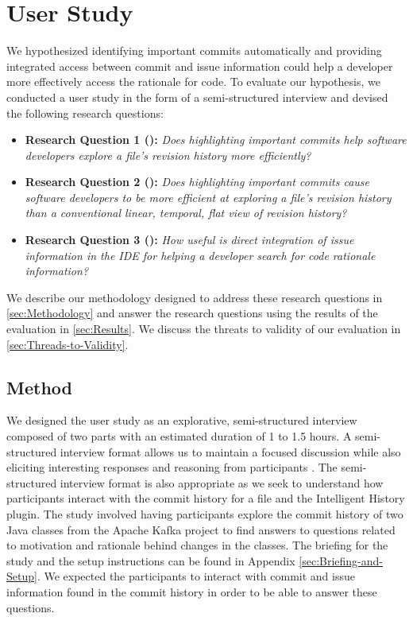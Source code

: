 \chapter{User Study}
\label{ch:Evaluation}

We hypothesized identifying important commits automatically and providing integrated access between commit and issue information could help a developer more effectively access the rationale for code.
To evaluate our hypothesis, we conducted a user study in the form of a semi-structured interview and devised the following research questions:

\begin{itemize}[leftmargin=*]
    \item[] \label{itm:RQ1} \textbf{Research Question 1 ():} \textit{Does highlighting important commits help software developers explore a file’s revision history more efficiently?}
    \item[] \label{itm:RQ2} \textbf{Research Question 2 ():} \textit{Does highlighting important commits cause software developers to be more efficient at exploring a file’s revision history than a conventional linear, temporal, flat view of revision history?}
    \item[] \label{itm:RQ3} \textbf{Research Question 3 ():} \textit{How useful is direct integration of issue information in the IDE for helping a developer search for code rationale information?}
  \end{itemize}

We describe our methodology designed to address these research questions in \autoref{sec:Methodology} and answer the research questions using the results of the evaluation in \autoref{sec:Results}.
We discuss the threats to validity of our evaluation in \autoref{sec:Threads-to-Validity}.

\section{Method}
\label{sec:Methodology}

We designed the user study as an explorative, semi-structured interview composed of two parts with an estimated duration of 1 to 1.5 hours.
A semi-structured interview format allows us to maintain a focused discussion while also eliciting interesting responses and reasoning from participants \cite{shull_guide_2007}.
The semi-structured interview format is also appropriate as we seek to understand how participants interact with the commit history for a file and the Intelligent History plugin.
The study involved having participants explore the commit history of two Java classes from the Apache Kafka project to find answers to questions related to motivation and rationale behind changes in the classes.
The briefing for the study and the setup instructions can be found in Appendix \ref{sec:Briefing-and-Setup}.
We expected the participants to interact with commit and issue information found in the commit history in order to be able to answer these questions.

